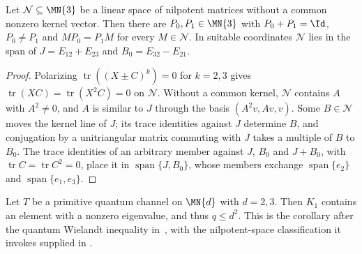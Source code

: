 \begin{lemma}
    \label{lem:nilpotent_space_three_grading}
    \leanok
    Let $\mathcal N\subseteq\MN{3}$ be a linear space of nilpotent matrices
    without a common nonzero kernel vector. Then there are $P_0,P_1\in\MN{3}$
    with $P_0+P_1=\Id$, $P_0\neq P_1$ and $MP_0=P_1M$ for every
    $M\in\mathcal N$. In suitable coordinates $\mathcal N$ lies in the span of
    $J=E_{12}+E_{23}$ and $B_0=E_{32}-E_{21}$.
\end{lemma}

\begin{proof}\leanok
    Polarizing $\operatorname{tr}((X\pm C)^k)=0$ for $k=2,3$ gives
    $\operatorname{tr}(XC)=\operatorname{tr}(X^2C)=0$ on $\mathcal N$.
    Without a common kernel, $\mathcal N$ contains $A$ with $A^2\neq0$, and
    $A$ is similar to $J$ through the basis $(A^2v,Av,v)$. Some $B\in\mathcal N$
    moves the kernel line of $J$; its trace identities against $J$ determine
    $B$, and conjugation by a unitriangular matrix commuting with $J$ takes a
    multiple of $B$ to $B_0$. The trace identities of an arbitrary member
    against $J$, $B_0$ and $J+B_0$, with $\operatorname{tr}C=\operatorname{tr}C^2=0$,
    place it in $\operatorname{span}\{J,B_0\}$, whose members exchange
    $\operatorname{span}\{e_2\}$ and $\operatorname{span}\{e_1,e_3\}$.
\end{proof}

\begin{corollary}
    \label{cor:wolf_low_dimensional_wielandt}
    \leanok
    Let $T$ be a primitive quantum channel on $\MN{d}$ with $d=2,3$. Then
    $K_1$ contains an element with a nonzero eigenvalue, and thus
    $q\leq d^2$. This is the corollary after the quantum Wielandt inequality
    in~\cite[Chapter~6]{Wolf2012Quantum}, with the nilpotent-space
    classification it invokes supplied in
    \cite{gap:wolf_ch6_lowdim_wielandt_classification}.
\end{corollary}

